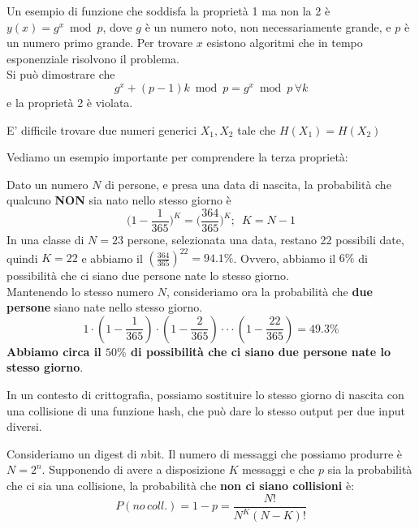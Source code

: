 \begin{example}
Un esempio di funzione che soddisfa la proprietà 1 ma non la 2 è $y(x)=g^x\bmod{p}$, dove $g$ è un numero noto, non necessariamente grande, e $p$ è un numero primo grande. Per trovare $x$ esistono algoritmi che in tempo esponenziale risolvono il problema\footnotemark.\\
Si può dimostrare che \[g^x+(p-1)k\bmod{p}=g^x\bmod{p}\,\forall{k}\] e la proprietà 2 è violata.
\end{example}
\begin{theorem}\label{thm:strongcollres}
E' difficile trovare due numeri generici $X_1,X_2$ tale che $H(X_1)=H(X_2)$
\end{theorem}
Vediamo un esempio importante per comprendere la terza proprietà:
\begin{example}
Dato un numero $N$ di persone, e presa una data di nascita, la probabilità che qualcuno \textbf{NON }sia nato nello stesso giorno è
\begin{equation*}
    \bigg(1-\frac{1}{365}\bigg)^K=\bigg(\frac{364}{365}\bigg)^K;\,\,\,K=N-1
\end{equation*}
In una classe di $N=23$ persone, selezionata una data, restano 22 possibili date, quindi $K=22$ e abbiamo il $\left(\frac{364}{365}\right)^{22}=94.1\%$. Ovvero, abbiamo il $6\%$ di possibilità che ci siano due persone nate lo stesso giorno.\\
Mantenendo lo stesso numero $N$, consideriamo ora la probabilità che \textbf{due persone} siano nate nello stesso giorno.
\begin{equation*}
    {1}\cdot\left({1}-\frac{{1}}{{365}}\right)\cdot\left({1}-\frac{{2}}{{365}}\right)\cdot\cdot\cdot\left({1}-\frac{{22}}{{365}}\right)={49.3}\%
\end{equation*}
\textbf{Abbiamo circa il $50\%$ di possibilità che ci siano due persone nate lo stesso giorno}.
\end{example}
In un contesto di crittografia, possiamo sostituire lo stesso giorno di nascita con una collisione di una funzione hash, che può dare lo stesso output per due input diversi. 
\begin{theorem}
Consideriamo un digest di $n$bit. Il numero di messaggi che possiamo produrre è $N=2^n$. Supponendo di avere a disposizione $K$ messaggi e che $p$ sia la probabilità che ci sia una collisione, la probabilità che \textbf{non ci siano collisioni} è:
\begin{equation}\label{eq:birthdayparadox}
    P(no\,coll.)=1-p=\frac{N!}{N^K(N-K)!}
\end{equation}
\end{theorem}
